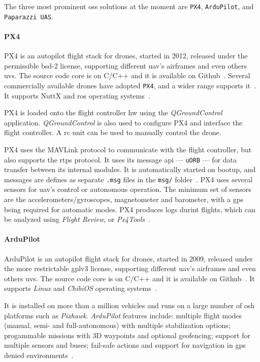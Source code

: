 The three most prominent \gls{oss} solutions at the moment are \texttt{PX4},
\texttt{ArduPilot}, and \texttt{Paparazzi UAS}.

\paragraph{PX4}
%
PX4 is an autopilot flight stack for drones, started in 2012, released under the
permissible \gls{bsd}-2 license, supporting different \gls{uav}'s airframes and
even others \glspl{uv}. The source code core is on C/C++ and it is available on
Github~\cite{px4-github}. Several commercially available drones have adopted
\texttt{PX4}, and a wider range supports it~\cite{px4-home}.
It supports NuttX and \gls{ros} operating systems~\cite{jargalsaikhan2022architectural}.

PX4 is loaded onto
the flight controller \gls{hw} using the \emph{QGroundControl}
application. \emph{QGroundControl} is also used to configure PX4 and interface
the flight controller. A \gls{rc} unit can be used to manually control the
drone.

PX4 uses the MAVLink protocol to communicate with the flight controller, but
also supports the \gls{rtps} protocol. It uses its message \gls{api} ---
\texttt{uORB} --- for data transfer between its internal modules. It is
automatically started on bootup, and messages are defines as separate
\texttt{.msg} files in the \texttt{msg/} folder~\cite{jargalsaikhan2022architectural}. PX4 uses
several sensors for \gls{uav}'s control or autonomous operation. The minimum set
of sensors are the accelerometers/gyroscopes, magnetometer and barometer, with a
\gls{gps} being required for automatic modes. PX4 produces logs durint flights, which can be analyzed using \emph{Flight
  Review}, or \emph{Px4Tools}~\cite{glossner2021overview}. 

\paragraph{ArduPilot}
%
ArduPilot is an autopilot flight stack for drones, started in 2009,
released under the more restrictable \gls{gpl}v3 license, supporting different \gls{uav}'s airframes and
even others \glspl{uv}. The source code core is on C/C++ and it is available on
Github~\cite{arduPilot-github}.
It supports \emph{Linux} and \emph{ChibiOS} operating systems~\cite{jargalsaikhan2022architectural}.

It is installed on more than a million vehicles and runs on a large number of
\gls{osh} platforms such as \emph{Pixhawk}. \emph{ArduPilot} features include:
multiple flight modes (manual, semi- and full-autonomous) with multiple
stabilization options; progammable missions with 3D waypoints and optional
geofencing; support for multiple sensors and buses; fail-safe actions and
support for navigation in \gls{gps} denied environments~\cite{arduPilot-home}.

